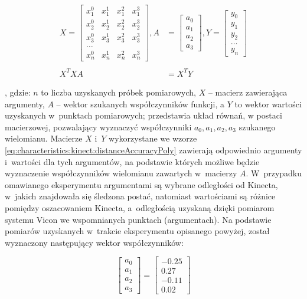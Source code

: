 \begin{equation}
	\begin{split}
		X = 	\begin{bmatrix}
		x_1^0&x_1^1&x_1^2&x_1^3\\
		x_2^0&x_2^1&x_2^2&x_2^3\\
		x_3^0&x_3^1&x_3^2&x_3^3\\
		\dots\\
		x_n^0&x_n^1&x_n^2&x_n^3
		\end{bmatrix} ,
		A &= 	\begin{bmatrix}
		a_0\\a_1\\a_2\\a_3
		\end{bmatrix} ,
		Y = 
		\begin{bmatrix}
			y_0 \\y_1\\y_2\\\dots\\y_n
		\end{bmatrix} \\
		& \\
		X^TXA &= X^TY
	\end{split}
	\label{eq:characteristics:kinect:distanceAccuracyPoly}
\end{equation}

, gdzie: $n$ to liczba uzyskanych próbek pomiarowych, $X$ -- macierz zawierająca argumenty,	$A$ -- wektor szukanych współczynników funkcji, a $Y$ to wektor wartości uzyskanych w~punktach pomiarowych; przedstawia układ równań, w postaci macierzowej, pozwalający wyznaczyć współczynniki $a_0 ,a_1, a_2, a_3$ szukanego wielomianu. Macierze $X$ i~$Y$ wykorzystane we wzorze \ref{eq:characteristics:kinect:distanceAccuracyPoly} zawierają odpowiednio argumenty i~wartości dla tych argumentów, na podstawie których możliwe będzie wyznaczenie współczynników wielomianu zawartych w~macierzy $A$. W~przypadku omawianego eksperymentu argumentami są wybrane odległości od Kinecta, w~jakich znajdowała się śledzona postać, natomiast wartościami są różnice pomiędzy oszacowaniem Kinecta, a~odległością uzyskaną dzięki pomiarom systemu Vicon we wspomnianych punktach (argumentach). Na podstawie pomiarów uzyskanych w~trakcie eksperymentu opisanego powyżej,  został wyznaczony następujący wektor współczynników:

\begin{equation}
	\label{eq:characteristics:kinect:distanceAccuracyCoef}
	\begin{bmatrix}
		a_0 \\a_1\\a_2\\a_3
	\end{bmatrix} = 
	\begin{bmatrix}
		- 0.25 \\  0.27 \\- 0.11\\0.02		
	\end{bmatrix}	
\end{equation}
		
